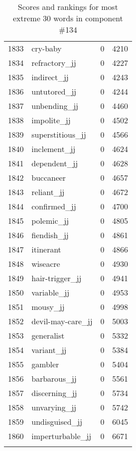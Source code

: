 \begin{longtable}[!htbp]{| rlr@{.}l |}
    1833 & cry-baby & 0 & 4210 \\
    1834 & refractory\_jj & 0 & 4227 \\
    1835 & indirect\_jj & 0 & 4243 \\
    1836 & untutored\_jj & 0 & 4244 \\
    1837 & unbending\_jj & 0 & 4460 \\
    1838 & impolite\_jj & 0 & 4502 \\
    1839 & superstitious\_jj & 0 & 4566 \\
    1840 & inclement\_jj & 0 & 4624 \\
    1841 & dependent\_jj & 0 & 4628 \\
    1842 & buccaneer & 0 & 4657 \\
    1843 & reliant\_jj & 0 & 4672 \\
    1844 & confirmed\_jj & 0 & 4700 \\
    1845 & polemic\_jj & 0 & 4805 \\
    1846 & fiendish\_jj & 0 & 4861 \\
    1847 & itinerant & 0 & 4866 \\
    1848 & wiseacre & 0 & 4930 \\
    1849 & hair-trigger\_jj & 0 & 4941 \\
    1850 & variable\_jj & 0 & 4953 \\
    1851 & mousy\_jj & 0 & 4998 \\
    1852 & devil-may-care\_jj & 0 & 5003 \\
    1853 & generalist & 0 & 5332 \\
    1854 & variant\_jj & 0 & 5384 \\
    1855 & gambler & 0 & 5404 \\
    1856 & barbarous\_jj & 0 & 5561 \\
    1857 & discerning\_jj & 0 & 5734 \\
    1858 & unvarying\_jj & 0 & 5742 \\
    1859 & undisguised\_jj & 0 & 6045 \\
    1860 & imperturbable\_jj & 0 & 6671 \\
    \hline
    \caption{Scores and rankings for most extreme 30 words in component \#134} \\
\end{longtable}
